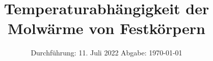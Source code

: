 

\subject{V47}
\title{Temperaturabhängigkeit der Molwärme von Festkörpern}
\date{%
  Durchführung: 11. Juli 2022
  \hspace{3em}
  Abgabe: \today
}



\maketitle
\thispagestyle{empty}
\tableofcontents
\newpage







\nocite{matplotlib}
\nocite{numpy}
\nocite{scipy}
\nocite{uncertainties}
\printbibliography{}


